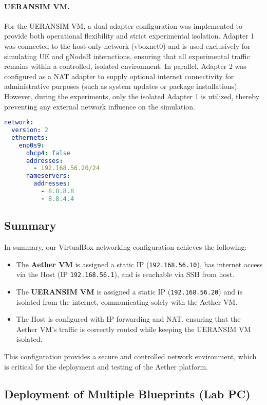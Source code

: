 \paragraph{UERANSIM VM.}
For the UERANSIM VM, a dual-adapter configuration was implemented to provide both operational flexibility and strict experimental isolation. Adapter 1 was connected to the host-only network (vboxnet0) and is used exclusively for simulating UE and gNodeB interactions, ensuring that all experimental traffic remains within a controlled, isolated environment. In parallel, Adapter 2 was configured as a NAT adapter to supply optional internet connectivity for administrative purposes (such as system updates or package installations). However, during the experiments, only the isolated Adapter 1 is utilized, thereby preventing any external network influence on the simulation.

\begin{lstlisting}[language=yaml, caption={Netplan configuration applied to the UERANSIM VM for static routing }]
network:
  version: 2
  ethernets:
    enp0s9:
      dhcp4: false
      addresses:
        - 192.168.56.20/24
      nameservers:
        addresses:
          - 8.8.8.8
          - 8.8.4.4
\end{lstlisting}


\subsection*{Summary}
In summary, our VirtualBox networking configuration achieves the following:
\begin{itemize}
    \item The \textbf{Aether VM} is assigned a static IP (\texttt{192.168.56.10}), has internet access via the Host (IP \texttt{192.168.56.1}), and is reachable via SSH from host.
    \item The \textbf{UERANSIM VM} is assigned a static IP (\texttt{192.168.56.20}) and is isolated from the internet, communicating solely with the Aether VM.
    \item The Host is configured with IP forwarding and NAT, ensuring that the Aether VM’s traffic is correctly routed while keeping the UERANSIM VM isolated.
\end{itemize}

This configuration provides a secure and controlled network environment, which is critical for the deployment and testing of the Aether platform.


\newpage
\subsection{Deployment of Multiple Blueprints (Lab PC)}
\label{subsec:multi-blueprints-deployment}

